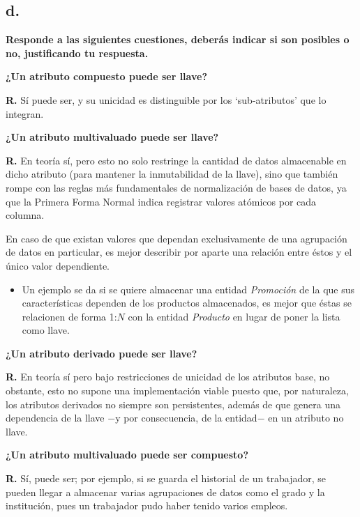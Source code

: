 \subsection*{d. }

    
\textbf{Responde a las siguientes cuestiones, deberás indicar si son posibles o no, justificando tu respuesta.}

\textbf{¿Un atributo compuesto puede ser llave?}

\textbf{R.} Sí puede ser, y su unicidad es distinguible por los `sub-atributos' que lo integran.

\textbf{¿Un atributo multivaluado puede ser llave?}

\textbf{R.} En teoría sí, pero esto no solo restringe la cantidad de datos almacenable en dicho atributo (para mantener la inmutabilidad de la llave), sino que también rompe con las reglas más fundamentales de normalización de bases de datos, ya que la Primera Forma Normal indica registrar valores atómicos por cada columna.

En caso de que existan valores que dependan exclusivamente de una agrupación de datos en particular, es mejor describir por aparte una relación entre éstos y el único valor dependiente.
\begin{itemize}
    \item Un ejemplo se da si se quiere almacenar una entidad \textit{Promoción} de la que sus características dependen de los productos almacenados, es mejor que éstas se relacionen de forma 1:$N$ con la entidad \textit{Producto} en lugar de poner la lista como llave.
\end{itemize}


\textbf{¿Un atributo derivado puede ser llave?}

\textbf{R.} En teoría sí pero bajo restricciones de unicidad de los atributos base, no obstante, esto no supone una implementación viable puesto que, por naturaleza, los atributos derivados no siempre son persistentes, además de que genera una dependencia de la llave $-$y por consecuencia, de la entidad$-$ en un atributo no llave.

\textbf{¿Un atributo multivaluado puede ser compuesto?}

\textbf{R.} Sí, puede ser; por ejemplo, si se guarda el historial de un trabajador, se pueden llegar a almacenar varias agrupaciones de datos como el grado y la institución, pues un trabajador pudo haber tenido varios empleos.

